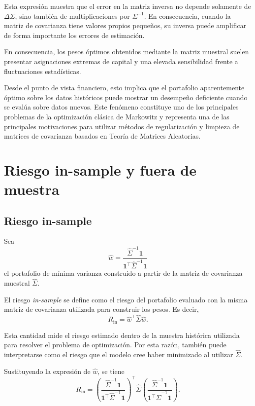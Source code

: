 \documentclass[letterpaper,12pt,oneside]{book}
\begin{document}
Esta expresión muestra que el error en la matriz inversa no depende solamente de \(\Delta\Sigma\), sino también de multiplicaciones por \(\Sigma^{-1}\). En consecuencia, cuando la matriz de covarianza tiene valores propios pequeños, su inversa puede amplificar de forma importante los errores de estimación.

En consecuencia, los pesos óptimos obtenidos mediante la matriz muestral suelen presentar asignaciones extremas de capital y una elevada sensibilidad frente a fluctuaciones estadísticas.

Desde el punto de vista financiero, esto implica que el portafolio aparentemente óptimo sobre los datos históricos puede mostrar un desempeño deficiente cuando se evalúa sobre datos nuevos. Este fenómeno constituye uno de los principales problemas de la optimización clásica de Markowitz y representa una de las principales motivaciones para utilizar métodos de regularización y limpieza de matrices de covarianza basados en Teoría de Matrices Aleatorias.

\section{Riesgo in-sample y fuera de muestra}
\subsection{Riesgo in-sample}

Sea
\[
\widehat{w}
=
\frac{
\widehat{\Sigma}^{-1}\mathbf{1}
}{
\mathbf{1}^\top
\widehat{\Sigma}^{-1}
\mathbf{1}
}
\]
el portafolio de mínima varianza construido a partir de la matriz de covarianza muestral \(\widehat{\Sigma}\).

El riesgo \textit{in-sample} se define como el riesgo del portafolio evaluado con la misma matriz de covarianza utilizada para construir los pesos. Es decir,
\[
R_{\mathrm{in}}
=
\widehat{w}^\top
\widehat{\Sigma}
\widehat{w}.
\]

Esta cantidad mide el riesgo estimado dentro de la muestra histórica utilizada para resolver el problema de optimización. Por esta razón, también puede interpretarse como el riesgo que el modelo cree haber minimizado al utilizar \(\widehat{\Sigma}\).

Sustituyendo la expresión de \(\widehat{w}\), se tiene
\[
R_{\mathrm{in}}
=
\left(
\frac{
\widehat{\Sigma}^{-1}\mathbf{1}
}{
\mathbf{1}^\top
\widehat{\Sigma}^{-1}
\mathbf{1}
}
\right)^\top
\widehat{\Sigma}
\left(
\frac{
\widehat{\Sigma}^{-1}\mathbf{1}
}{
\mathbf{1}^\top
\widehat{\Sigma}^{-1}
\mathbf{1}
}
\right).
\]
\end{document}
